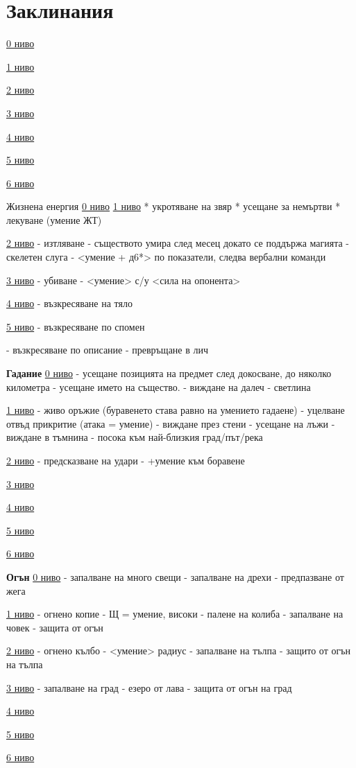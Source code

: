 \section{Заклинания} 

\textbf{}
\underline{0 ниво}

\underline{1 ниво}

\underline{2 ниво}

\underline{3 ниво}

\underline{4 ниво}

\underline{5 ниво}

\underline{6 ниво}


Жизнена енергия 
\underline{0 ниво} 
\underline{1 ниво}
* укротяване на звяр
* усещане за немъртви
* лекуване (умение ЖТ)

\underline{2 ниво}
- изтляване - съществото умира след месец  докато се поддържа магията
- скелетен слуга - <умение + д6*> по показатели, следва вербални команди

\underline{3 ниво}
- убиване - <умение> с/у <сила на опонента>

\underline{4 ниво}
- възкресяване на тяло

\underline{5 ниво}
- възкресяване по спомен

- възкресяване по описание
- превръщане в лич

\textbf{Гадание}
\underline{0 ниво}
- усещане позицията на предмет след докосване, до няколко километра
- усещане името на същество.
- виждане на далеч
- светлина

\underline{1 ниво}
- живо оръжие (буравенето става равно на умението гадаене)
- уцелване отвъд прикритие (атака = умение)
- виждане през стени
- усещане на лъжи
- виждане в тъмнина
- посока към най-близкия град/път/река

\underline{2 ниво}
- предсказване на удари - +умение към боравене

\underline{3 ниво}

\underline{4 ниво}

\underline{5 ниво}

\underline{6 ниво}



\textbf{Огън}
\underline{0 ниво}
- запалване на много свещи
- запалване на дрехи
- предпазване от жега

\underline{1 ниво}
- огнено копие - Щ = умение, високи
- палене на колиба
- запалване на човек
- защита от огън

\underline{2 ниво}
- огнено кълбо - <умение> радиус
- запалване на тълпа
- защито от огън на тълпа

\underline{3 ниво}
- запалване на град
- езеро от лава
- защита от огън на град

\underline{4 ниво}

\underline{5 ниво}

\underline{6 ниво}








